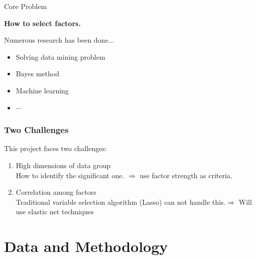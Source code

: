 \documentclass[12pt]{beamer}
\begin{document}
\begin{frame}{Core Problem}
\begin{center}
\alert{\textbf{How to select factors.}}\pause
\end{center}
Numerous research has been done...
\begin{itemize}
\item Solving data mining problem 
\item Bayes method
\item Machine learning
\item $\cdots$
\end{itemize}

\end{frame}


\begin{frame}
	\frametitle{Two Challenges}
	This project faces two challenges:
	\begin{enumerate}
		\item	 High dimensions of data group\\
		How to identify the significant one. $\Rightarrow$ \alert{use factor strength as criteria.}
		\item 	Correlation among factors \\
		Traditional variable selection algorithm (Lasso) can not handle this.$\Rightarrow$ Will use \alert{elastic net} techniques
	\end{enumerate}
\end{frame}





	\section{Data and Methodology}
	
\end{document}
